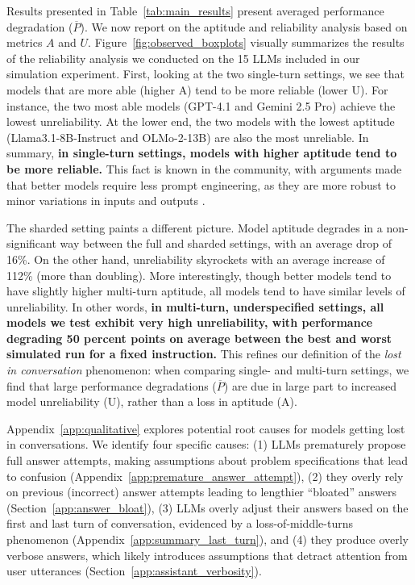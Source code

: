 \documentclass{article}
\begin{document}
Results presented in Table~\ref{tab:main_results} present averaged performance degradation ($\overline{P}$). We now report on the aptitude and reliability analysis based on metrics $A$ and $U$. Figure~\ref{fig:observed_boxplots} visually summarizes the results of the reliability analysis we conducted on the 15 LLMs included in our simulation experiment. First, looking at the two single-turn settings, we see that models that are more able (higher A) tend to be more reliable (lower U). For instance, the two most able models (GPT-4.1 and Gemini 2.5 Pro) achieve the lowest unreliability. At the lower end, the two models with the lowest aptitude (Llama3.1-8B-Instruct and OLMo-2-13B) are also the most unreliable. In summary, \textbf{in single-turn settings, models with higher aptitude tend to be more reliable.} This fact is known in the community, with arguments made that better models require less prompt engineering, as they are more robust to minor variations in inputs and outputs \cite{li2023instruction}.

The sharded setting paints a different picture. Model aptitude degrades in a non-significant way between the full and sharded settings, with an average drop of 16\%. On the other hand, unreliability skyrockets with an average increase of 112\% (more than doubling). More interestingly, though better models tend to have slightly higher multi-turn aptitude, all models tend to have similar levels of unreliability. In other words, \textbf{in multi-turn, underspecified settings, all models we test exhibit very high unreliability, with performance degrading 50 percent points on average between the best and worst simulated run for a fixed instruction.} This refines our definition of the \textit{lost in conversation} phenomenon: when comparing single- and multi-turn settings, we find that large performance degradations ($\overline{P}$) are due in large part to increased model unreliability (U), rather than a loss in aptitude (A).

Appendix~\ref{app:qualitative} explores potential root causes for models getting lost in conversations. We identify four specific causes: (1) LLMs prematurely propose full answer attempts, making assumptions about problem specifications that lead to confusion (Appendix~\ref{app:premature_answer_attempt}), (2) they overly rely on previous (incorrect) answer attempts leading to lengthier ``bloated'' answers (Section~\ref{app:answer_bloat}), (3) LLMs overly adjust their answers based on the first and last turn of conversation, evidenced by a loss-of-middle-turns phenomenon (Appendix~\ref{app:summary_last_turn}), and (4) they produce overly verbose answers, which likely introduces assumptions that detract attention from user utterances (Section~\ref{app:assistant_verbosity}).
\end{document}
